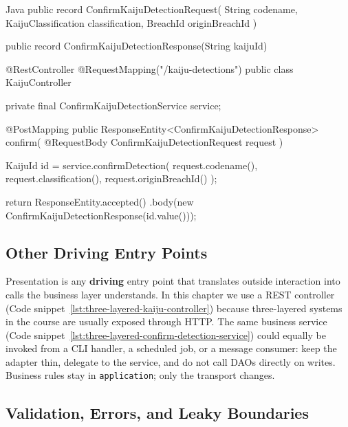 \begin{ridercode}{Java}
public record ConfirmKaijuDetectionRequest(
    String codename,
    KaijuClassification classification,
    BreachId originBreachId
) {}

public record ConfirmKaijuDetectionResponse(String kaijuId) {}

@RestController
@RequestMapping("/kaiju-detections")
public class KaijuController
{
    private final ConfirmKaijuDetectionService service;

    @PostMapping
    public ResponseEntity<ConfirmKaijuDetectionResponse> confirm(
        @RequestBody ConfirmKaijuDetectionRequest request
    )
    {
        KaijuId id = service.confirmDetection(
            request.codename(),
            request.classification(),
            request.originBreachId()
        );

        return ResponseEntity.accepted()
            .body(new ConfirmKaijuDetectionResponse(id.value()));
    }
}
\end{ridercode}
\label{lst:three-layered-kaiju-controller}

\subsection{Other Driving Entry Points}
\label{sec:three_layered_other_channels}

Presentation is any \textbf{driving} entry point that translates outside interaction into calls the business layer understands. In this chapter we use a REST controller (Code snippet~\ref{lst:three-layered-kaiju-controller}) because three-layered systems in the course are usually exposed through HTTP. The same business service (Code snippet~\ref{lst:three-layered-confirm-detection-service}) could equally be invoked from a CLI handler, a scheduled job, or a message consumer: keep the adapter thin, delegate to the service, and do not call DAOs directly on writes. Business rules stay in \texttt{application}; only the transport changes.

\subsection{Validation, Errors, and Leaky Boundaries}
\label{sec:three_layered_validation_errors}

